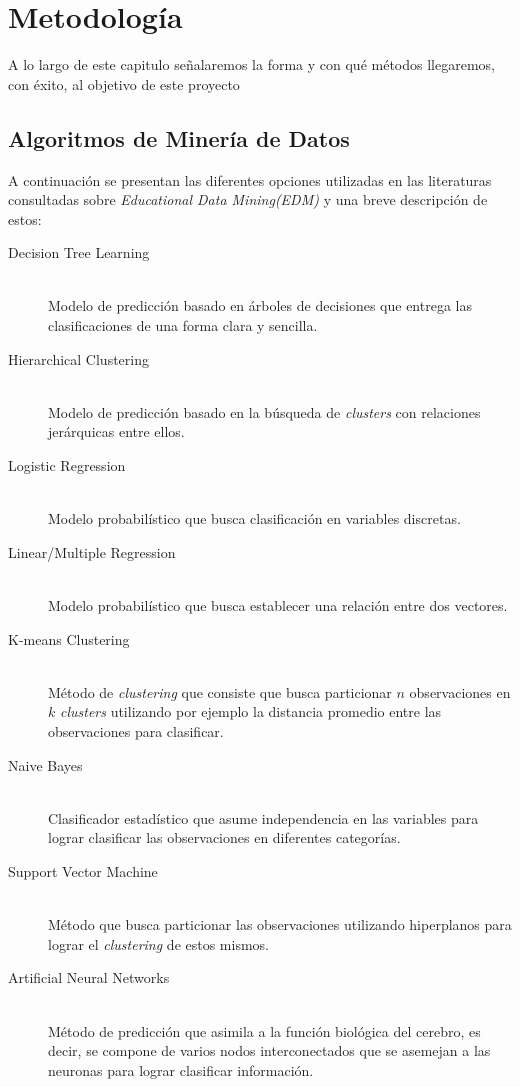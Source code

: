 \chapter{Metodología}
A lo largo de este capitulo señalaremos la forma y con qué métodos llegaremos, con éxito, al objetivo de este proyecto
\section{Algoritmos de Minería de Datos}
A continuación se presentan las diferentes opciones utilizadas en las literaturas consultadas sobre \textit{Educational Data Mining(EDM)}\cite{EDMSurv} y una breve descripción de estos:
\begin{description}
  \item[Decision Tree Learning] \hfill \\
  Modelo de predicción basado en árboles de decisiones que entrega las clasificaciones de una forma clara y sencilla.
  \item[Hierarchical Clustering] \hfill \\
  Modelo de predicción basado en la búsqueda de \textit{clusters} con relaciones jerárquicas entre ellos.
  \item[Logistic Regression] \hfill \\
  Modelo probabilístico que busca clasificación en variables discretas. 
    \item[Linear/Multiple Regression] \hfill \\
  Modelo probabilístico que busca establecer una relación entre dos vectores. \newpage
  \item[K-means Clustering] \hfill \\
  Método de \textit{clustering} que consiste que busca particionar $n$ observaciones en $k$ \textit{clusters} utilizando por ejemplo la distancia promedio entre las observaciones para clasificar.
  \item[Naive Bayes] \hfill \\
  Clasificador estadístico que asume independencia en las variables para lograr clasificar las observaciones en diferentes categorías.
  \item[Support Vector Machine] \hfill \\
  Método que busca particionar las observaciones utilizando hiperplanos para lograr el \textit{clustering} de estos mismos.
  \item[Artificial Neural Networks] \hfill \\
  Método de predicción que asimila a la función biológica del cerebro, es decir, se compone de varios nodos interconectados que se asemejan a las neuronas para lograr clasificar información.
\end{description}
